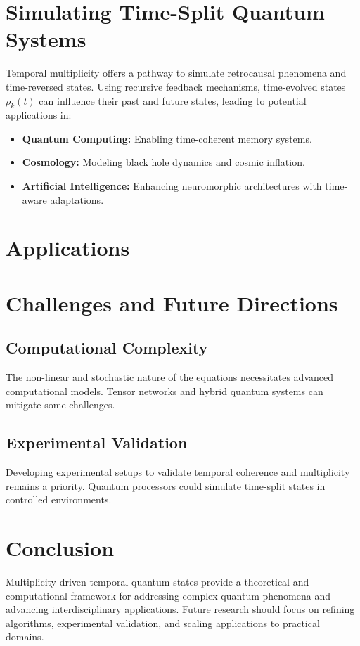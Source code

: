 \documentclass{article}
\theoremstyle{plain}
\begin{document}
\section{Simulating Time-Split Quantum Systems}
Temporal multiplicity offers a pathway to simulate retrocausal phenomena and time-reversed states. Using recursive feedback mechanisms, time-evolved states $\rho_k(t)$ can influence their past and future states, leading to potential applications in:
\begin{itemize}
    \item \textbf{Quantum Computing:} Enabling time-coherent memory systems.
    \item \textbf{Cosmology:} Modeling black hole dynamics and cosmic inflation.
    \item \textbf{Artificial Intelligence:} Enhancing neuromorphic architectures with time-aware adaptations.
\end{itemize}

\section{Applications}


\section{Challenges and Future Directions}
\subsection{Computational Complexity}
The non-linear and stochastic nature of the equations necessitates advanced computational models. Tensor networks and hybrid quantum systems can mitigate some challenges.

\subsection{Experimental Validation}
Developing experimental setups to validate temporal coherence and multiplicity remains a priority. Quantum processors could simulate time-split states in controlled environments.

\section{Conclusion}
Multiplicity-driven temporal quantum states provide a theoretical and computational framework for addressing complex quantum phenomena and advancing interdisciplinary applications. Future research should focus on refining algorithms, experimental validation, and scaling applications to practical domains.


\nocite{*}


\end{document}
